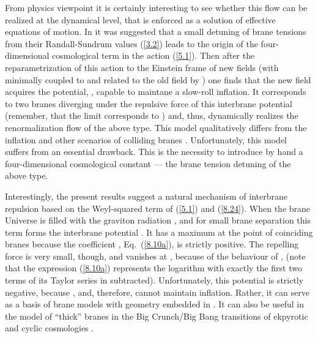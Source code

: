 \documentclass[a4paper,12pt]{article}
\begin{document}
From physics viewpoint it is certainly
interesting to see whether this flow can be realized at the dynamical
level, that is enforced as a solution of effective equations of
motion. In \cite{brane} it was suggested that a small detuning of
brane tensions from their Randall-Sundrum values (\ref{3.2}) leads to
the origin of the four-dimensional cosmological term in the action
(\ref{5.1}). Then after the reparametrization of this action to the
Einstein frame of new fields \coordHE{} (with \myHighlight{$\phi$}\coordHE{}
minimally coupled to \coordHE{} and related to the old field
\myHighlight{$\varphi$}\coordHE{} by
\coordHE{}) one
finds that the new field \myHighlight{$\phi$}\coordHE{} acquires the potential,
\coordHE{}, capable to
maintane a slow-roll inflation. It corresponds to
two branes diverging under the repulsive force of this interbrane
potential (remember, that the limit \coordHE{} corresponds to
\coordHE{}) and, thus, dynamically realizes the renormalization flow
of the above type. This model qualitatively differs from the inflation
and other scenarios of colliding branes \cite{DTye,Ekpyr}.
Unfortunately, this model suffers from an essential drawback.
This is the necessity to introduce by hand a four-dimensional
cosmological constant --- the brane tension detuning of the above
type.

Interestingly, the present results suggest a natural mechanism
of interbrane repulsion based on the Weyl-squared term of
(\ref{5.1}) and (\ref{8.24}). When the brane Universe is
filled with the graviton radiation \coordHE{},
and for small brane separation this term forms the interbrane
potential \coordHE{}. It has
a maximum
at the point of coinciding branes \coordHE{} because the coefficient
\coordHE{}, Eq.~(\ref{8.10a}), is strictly positive. The
repelling force is very small, though, and vanishes
at \coordHE{}, because of the behaviour of
\coordHE{}, \coordHE{}
(note that the expression (\ref{8.10a})
represents  the logarithm \coordHE{} with exactly
the first two terms of its Taylor series in \coordHE{}
subtracted). Unfortunately, this
potential is strictly negative, because \coordHE{}, and,
therefore, cannot maintain
inflation. Rather, it can serve as a basis of brane
models with \coordHE{} geometry embedded in \coordHE{} \cite{AdS_4brane}.
It can also be useful in the model of ``thick'' branes in the
Big Crunch/Big Bang transitions of ekpyrotic and
cyclic cosmologies \cite{Ekpyr}.
\end{document}

